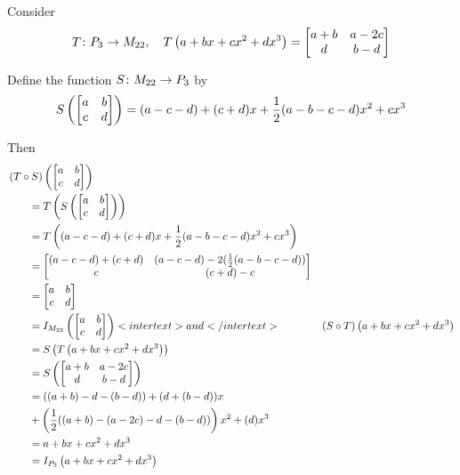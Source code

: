 \documentclass{ximera}
\begin{document}
\begin{example}
Consider
\[
T\colon P_3\rightarrow M_{22},\quad T\left(a+bx+cx^2+dx^3\right)=
\begin{bmatrix}
a+b & a-2c\\
d & b-d
\end{bmatrix}
\]

Define the function $S\colon M_{22}\rightarrow P_3$ by
\[
S\left(\begin{bmatrix}a&b\\c&d\end{bmatrix}\right)=(a - c - d)+ (c + d)x +\frac{1}{2}(a - b - c - d)x^2+cx^3
\]

Then
\begin{align*}
&\left({T}\circ{S}\right)\left(\begin{bmatrix}a&b\\c&d\end{bmatrix}\right)\\
&\quad\quad=T\left(S\left(\begin{bmatrix}a&b\\c&d\end{bmatrix}\right)\right)\\
&\quad\quad=T\left((a - c - d)+ (c + d)x +\frac{1}{2}(a - b - c - d)x^2+cx^3\right)\\
&\quad\quad=\begin{bmatrix}
(a - c - d)+ (c + d)&(a - c - d)-2(\frac{1}{2}(a - b - c - d))\\c&(c + d)-c
\end{bmatrix}\\
&\quad\quad=\begin{bmatrix}a&b\\c&d\end{bmatrix}\\
&\quad\quad=I_{M_{22}}\left(\begin{bmatrix}a&b\\c&d\end{bmatrix}\right)
<intertext>and</intertext>
&\left({S}\circ{T}\right)\left(a+bx+cx^2+dx^3\right)\\
&\quad\quad=S\left(T\left(a+bx+cx^2+dx^3\right)\right)\\
&\quad\quad=S\left(\begin{bmatrix}
a+b&a-2c\\d&b-d
\end{bmatrix}\right)\\
&\quad\quad=((a+b)-d-(b-d))+
(d+(b-d))x\\
&\quad\quad+\left(\frac{1}{2}((a+b)-(a-2c)-d-(b-d))\right)x^2+
(d)x^3\\
&\quad\quad=a+bx+cx^2+dx^3\\
&\quad\quad=I_{P_3}\left(a+bx+cx^2+dx^3\right)
\end{align*}


\end{example}
\end{document}

